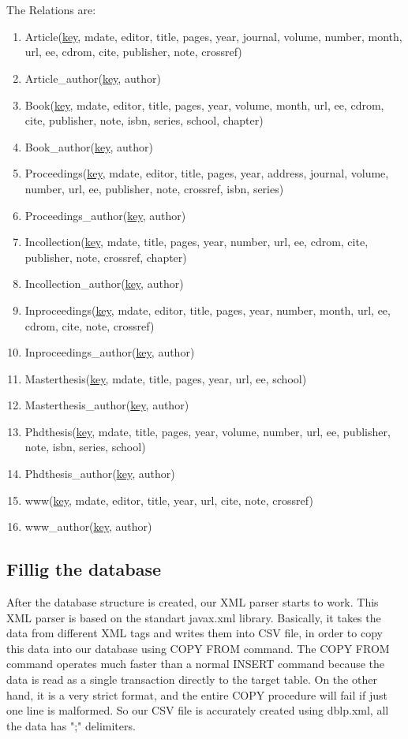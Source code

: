 \documentclass{acm_proc_article-sp}
\begin{document}
\\
\\The Relations are:
\begin{enumerate}
	\item Article(\underline{key}, mdate, editor, title, pages, year, journal, volume, number, month, url, ee, cdrom, cite, publisher, note, crossref)
	\item Article\_author(\underline{key}, author)
	\item Book(\underline{key}, mdate, editor, title, pages, year, volume, month, url, ee, cdrom, cite, publisher, note, isbn, series, school, chapter)
	\item Book\_author(\underline{key}, author)
	\item Proceedings(\underline{key}, mdate, editor, title, pages, year, address, journal, volume, number, url, ee, publisher, note, crossref, isbn, series)
	\item Proceedings\_author(\underline{key}, author)
	\item Incollection(\underline{key}, mdate, title, pages, year, number, url, ee, cdrom, cite, publisher, note, crossref, chapter)
	\item Incollection\_author(\underline{key}, author)
	\item Inproceedings(\underline{key}, mdate, editor, title, pages, year, number, month, url, ee, cdrom, cite, note, crossref)
	\item Inproceedings\_author(\underline{key}, author)
	\item Masterthesis(\underline{key}, mdate, title, pages, year, url, ee, school)
	\item Masterthesis\_author(\underline{key}, author)
	\item Phdthesis(\underline{key}, mdate, title, pages, year, volume, number, url, ee, publisher, note, isbn, series, school)
	\item Phdthesis\_author(\underline{key}, author)
	\item www(\underline{key}, mdate, editor, title, year, url, cite, note, crossref)
	\item www\_author(\underline{key}, author)
\end{enumerate}
\subsection{Fillig the database}
After the database structure is created, our XML parser starts to work. This XML parser is based on the standart javax.xml library. Basically, it takes the data from different XML tags and writes them into CSV file, in order to copy this data into our database using COPY FROM command. The COPY FROM command operates much faster than a normal INSERT command because the data is read as a single transaction directly to the target table. On the other hand, it is a very strict format, and the entire COPY procedure will fail if just one line is malformed\cite{copy}.	So our CSV file is accurately created using dblp.xml, all the data has ";" delimiters.
\end{document}
